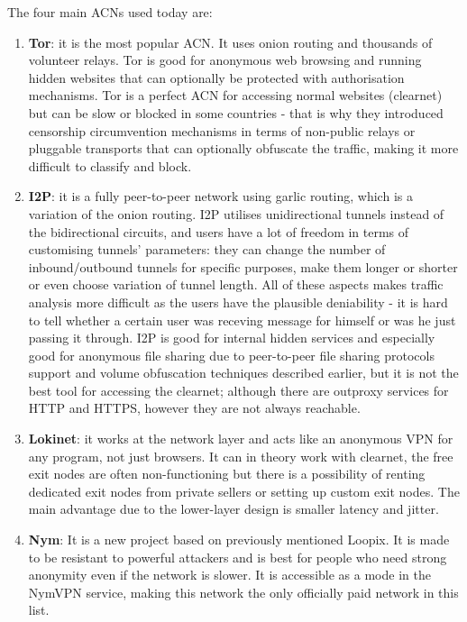 The four main ACNs used today are:
\begin{enumerate}
    \item \textbf{Tor}: it is the most popular ACN. It uses onion routing and thousands of volunteer relays. Tor is good for anonymous web browsing and running hidden websites that can optionally be protected with authorisation mechanisms. Tor is a perfect ACN for accessing normal websites (clearnet) but can be slow or blocked in some countries - that is why they introduced censorship circumvention mechanisms in terms of non-public relays or pluggable transports that can optionally obfuscate the traffic, making it more difficult to classify and block.
    \item \textbf{I2P}: it is a fully peer-to-peer network using garlic routing, which is a variation of the onion routing. I2P utilises unidirectional tunnels instead of the bidirectional circuits, and users have a lot of freedom in terms of customising tunnels' parameters: they can change the number of inbound/outbound tunnels for specific purposes, make them longer or shorter or even choose variation of tunnel length. All of these aspects makes traffic analysis more difficult as the users have the plausible deniability - it is hard to tell whether a certain user was receving message for himself or was he just passing it through. I2P is good for internal hidden services and especially good for anonymous file sharing due to peer-to-peer file sharing protocols support and volume obfuscation techniques described earlier, but it is not the best tool for accessing the clearnet; although there are outproxy services for HTTP and HTTPS, however they are not always reachable.
    \item \textbf{Lokinet}: it works at the network layer and acts like an anonymous VPN for any program, not just browsers. It can in theory work with clearnet, the free exit nodes are often non-functioning but there is a possibility of renting dedicated exit nodes from private sellers or setting up custom exit nodes. The main advantage due to the lower-layer design is smaller latency and jitter.
    \item \textbf{Nym}: It is a new project based on previously mentioned Loopix. It is made to be resistant to powerful attackers and is best for people who need strong anonymity even if the network is slower. It is accessible as a mode in the NymVPN service, making this network the only officially paid network in this list.
\end{enumerate}

